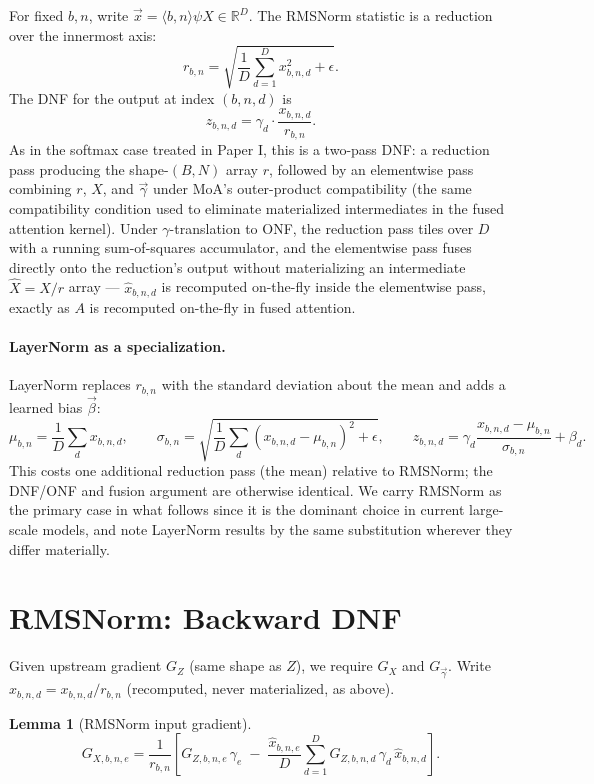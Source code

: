 \documentclass[11pt]{article}
\newcommand{\psii}{\psi}
\newcommand{\gammaop}{\gamma}
\newcommand{\vecx}{\vec{x}}
\theoremstyle{definition}
\newtheorem{lemma}{Lemma}
\begin{document}
For fixed $b,n$, write $\vecx = \langle b,n\rangle \psii X \in
\mathbb{R}^D$. The RMSNorm statistic is a reduction over the innermost
axis:
\[
r_{b,n} = \sqrt{\frac{1}{D}\sum_{d=1}^{D} x_{b,n,d}^2 + \epsilon}.
\]
The DNF for the output at index $(b,n,d)$ is
\[
z_{b,n,d} = \gamma_d \cdot \frac{x_{b,n,d}}{r_{b,n}}.
\]
As in the softmax case treated in Paper I, this is a two-pass DNF: a
reduction pass producing the shape-$(B,N)$ array $r$, followed by an
elementwise pass combining $r$, $X$, and $\vec\gamma$ under MoA's
outer-product compatibility (the same compatibility condition used to
eliminate materialized intermediates in the fused attention kernel).
Under $\gammaop$-translation to ONF, the reduction pass tiles over $D$
with a running sum-of-squares accumulator, and the elementwise pass
fuses directly onto the reduction's output without materializing an
intermediate $\hat X = X/r$ array --- $\hat x_{b,n,d}$ is recomputed
on-the-fly inside the elementwise pass, exactly as $A$ is recomputed
on-the-fly in fused attention.

\paragraph{LayerNorm as a specialization.} LayerNorm replaces $r_{b,n}$
with the standard deviation about the mean and adds a learned bias
$\vec\beta$:
\[
\mu_{b,n} = \frac{1}{D}\sum_d x_{b,n,d}, \qquad
\sigma_{b,n} = \sqrt{\frac{1}{D}\sum_d (x_{b,n,d}-\mu_{b,n})^2 + \epsilon},
\qquad
z_{b,n,d} = \gamma_d\frac{x_{b,n,d}-\mu_{b,n}}{\sigma_{b,n}} + \beta_d.
\]
This costs one additional reduction pass (the mean) relative to
RMSNorm; the DNF/ONF and fusion argument are otherwise identical. We
carry RMSNorm as the primary case in what follows since it is the
dominant choice in current large-scale models, and note LayerNorm
results by the same substitution wherever they differ materially.

\section{RMSNorm: Backward DNF}

Given upstream gradient $G_Z$ (same shape as $Z$), we require $G_X$ and
$G_{\vec\gamma}$. Write $\hat x_{b,n,d} = x_{b,n,d}/r_{b,n}$ (recomputed,
never materialized, as above).

\begin{lemma}[RMSNorm input gradient]
\[
G_{X,b,n,e} = \frac{1}{r_{b,n}}\left[
G_{Z,b,n,e}\,\gamma_e \;-\; \frac{\hat x_{b,n,e}}{D}
\sum_{d=1}^{D} G_{Z,b,n,d}\,\gamma_d\,\hat x_{b,n,d}
\right].
\]
\end{lemma}
\end{document}
